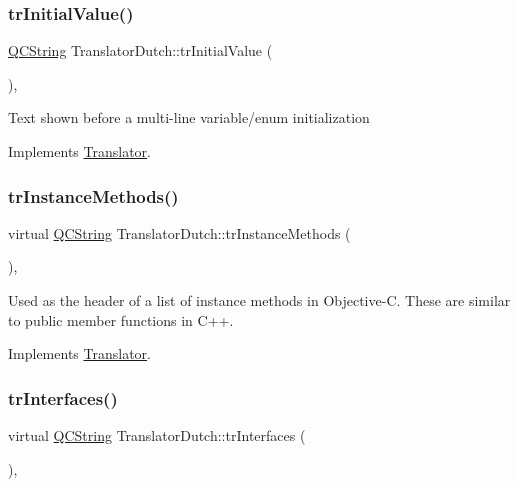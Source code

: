 \subsubsection{\texorpdfstring{trInitialValue()}{trInitialValue()}}
{\footnotesize\ttfamily \mbox{\hyperlink{class_q_c_string}{Q\+C\+String}} Translator\+Dutch\+::tr\+Initial\+Value (\begin{DoxyParamCaption}{ }\end{DoxyParamCaption})\hspace{0.3cm}{\ttfamily [inline]}, {\ttfamily [virtual]}}

Text shown before a multi-\/line variable/enum initialization 

Implements \mbox{\hyperlink{class_translator}{Translator}}.

\mbox{\label{class_translator_dutch_afb9b00e7ff7aa3acecd62fe0b35e2a52}} 
\subsubsection{\texorpdfstring{trInstanceMethods()}{trInstanceMethods()}}
{\footnotesize\ttfamily virtual \mbox{\hyperlink{class_q_c_string}{Q\+C\+String}} Translator\+Dutch\+::tr\+Instance\+Methods (\begin{DoxyParamCaption}{ }\end{DoxyParamCaption})\hspace{0.3cm}{\ttfamily [inline]}, {\ttfamily [virtual]}}

Used as the header of a list of instance methods in Objective-\/C. These are similar to public member functions in C++. 

Implements \mbox{\hyperlink{class_translator}{Translator}}.

\mbox{\label{class_translator_dutch_a57773fd6fe0f197912d9ddf38ba9f617}} 
\subsubsection{\texorpdfstring{trInterfaces()}{trInterfaces()}}
{\footnotesize\ttfamily virtual \mbox{\hyperlink{class_q_c_string}{Q\+C\+String}} Translator\+Dutch\+::tr\+Interfaces (\begin{DoxyParamCaption}{ }\end{DoxyParamCaption})\hspace{0.3cm}{\ttfamily [inline]}, {\ttfamily [virtual]}}

